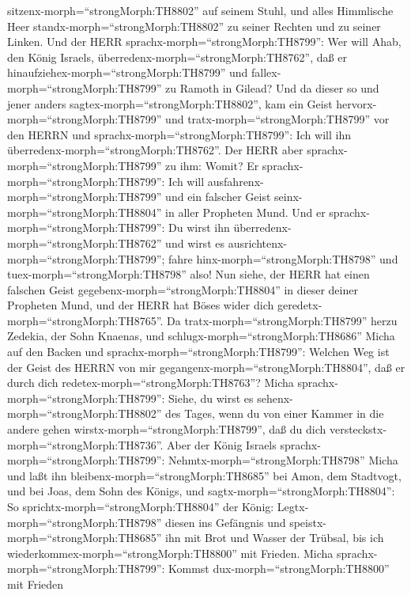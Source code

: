 sitzenx-morph=``strongMorph:TH8802'' auf seinem Stuhl, und alles
Himmlische Heer standx-morph=``strongMorph:TH8802'' zu seiner Rechten
und zu seiner Linken.  Und der HERR
sprachx-morph=``strongMorph:TH8799'': Wer will Ahab, den König Israels,
überredenx-morph=``strongMorph:TH8762'', daß er
hinaufziehex-morph=``strongMorph:TH8799'' und
fallex-morph=``strongMorph:TH8799'' zu Ramoth in Gilead? Und da dieser
so und jener anders sagtex-morph=``strongMorph:TH8802'', 
kam ein Geist hervorx-morph=``strongMorph:TH8799'' und
tratx-morph=``strongMorph:TH8799'' vor den HERRN und
sprachx-morph=``strongMorph:TH8799'': Ich will ihn
überredenx-morph=``strongMorph:TH8762''. Der HERR aber
sprachx-morph=``strongMorph:TH8799'' zu ihm: Womit?  Er
sprachx-morph=``strongMorph:TH8799'': Ich will
ausfahrenx-morph=``strongMorph:TH8799'' und ein falscher Geist
seinx-morph=``strongMorph:TH8804'' in aller Propheten Mund. Und er
sprachx-morph=``strongMorph:TH8799'': Du wirst ihn
überredenx-morph=``strongMorph:TH8762'' und wirst es
ausrichtenx-morph=``strongMorph:TH8799''; fahre
hinx-morph=``strongMorph:TH8798'' und tuex-morph=``strongMorph:TH8798''
also!  Nun siehe, der HERR hat einen falschen Geist
gegebenx-morph=``strongMorph:TH8804'' in dieser deiner Propheten Mund,
und der HERR hat Böses wider dich geredetx-morph=``strongMorph:TH8765''.
 Da tratx-morph=``strongMorph:TH8799'' herzu Zedekia, der
Sohn Knaenas, und schlugx-morph=``strongMorph:TH8686'' Micha auf den
Backen und sprachx-morph=``strongMorph:TH8799'': Welchen Weg ist der
Geist des HERRN von mir gegangenx-morph=``strongMorph:TH8804'', daß er
durch dich redetex-morph=``strongMorph:TH8763''?  Micha
sprachx-morph=``strongMorph:TH8799'': Siehe, du wirst es
sehenx-morph=``strongMorph:TH8802'' des Tages, wenn du von einer Kammer
in die andere gehen wirstx-morph=``strongMorph:TH8799'', daß du dich
versteckstx-morph=``strongMorph:TH8736''.  Aber der König
Israels sprachx-morph=``strongMorph:TH8799'':
Nehmtx-morph=``strongMorph:TH8798'' Micha und laßt ihn
bleibenx-morph=``strongMorph:TH8685'' bei Amon, dem Stadtvogt, und bei
Joas, dem Sohn des Königs,  und
sagtx-morph=``strongMorph:TH8804'': So
sprichtx-morph=``strongMorph:TH8804'' der König:
Legtx-morph=``strongMorph:TH8798'' diesen ins Gefängnis und
speistx-morph=``strongMorph:TH8685'' ihn mit Brot und Wasser der
Trübsal, bis ich wiederkommex-morph=``strongMorph:TH8800'' mit Frieden.
 Micha sprachx-morph=``strongMorph:TH8799'': Kommst
dux-morph=``strongMorph:TH8800'' mit Frieden
